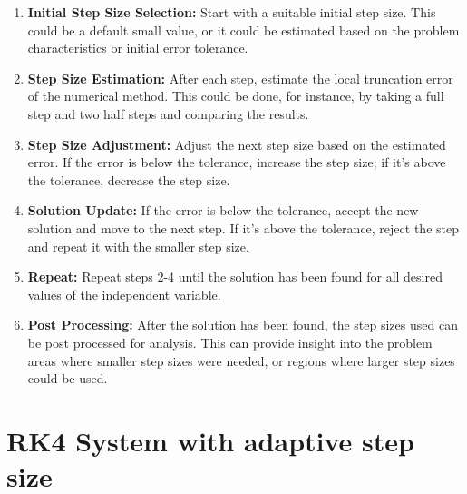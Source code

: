 \documentclass[12pt]{report}
\begin{document}
\begin{enumerate}
    \item \textbf{Initial Step Size Selection:} Start with a suitable initial step size. This could be a default small value, or it could be estimated based on the problem characteristics or initial error tolerance.

    \item \textbf{Step Size Estimation:} After each step, estimate the local truncation error of the numerical method. This could be done, for instance, by taking a full step and two half steps and comparing the results.

    \item \textbf{Step Size Adjustment:} Adjust the next step size based on the estimated error. If the error is below the tolerance, increase the step size; if it's above the tolerance, decrease the step size.

    \item \textbf{Solution Update:} If the error is below the tolerance, accept the new solution and move to the next step. If it's above the tolerance, reject the step and repeat it with the smaller step size.

    \item \textbf{Repeat:} Repeat steps 2-4 until the solution has been found for all desired values of the independent variable.

    \item \textbf{Post Processing:} After the solution has been found, the step sizes used can be post processed for analysis. This can provide insight into the problem areas where smaller step sizes were needed, or regions where larger step sizes could be used.
\end{enumerate}

\section*{RK4 System with adaptive step size}
\end{document}
